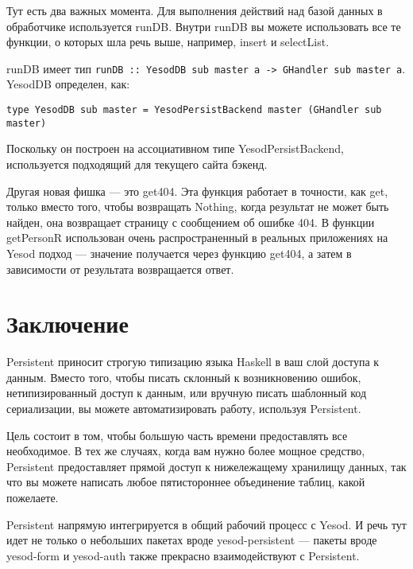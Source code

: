 Тут есть два важных момента. Для выполнения действий над базой данных в обработчике используется runDB. Внутри runDB вы можете использовать все те функции, о которых шла речь выше, например, insert и selectList. 

\begin{remark}
runDB имеет тип \lstinline'runDB :: YesodDB sub master a -> GHandler sub master a'. YesodDB определен, как:

\begin{lstlisting}
type YesodDB sub master = YesodPersistBackend master (GHandler sub master)
\end{lstlisting}

Поскольку он построен на ассоциативном типе YesodPersistBackend, используется подходящий для текущего сайта бэкенд.
\end{remark}

Другая новая фишка --- это get404. Эта функция работает в точности, как get, только вместо того, чтобы возвращать Nothing, когда результат не может быть найден, она возвращает страницу с сообщением об ошибке 404. В функции getPersonR использован очень распространенный в реальных приложениях на Yesod подход --- значение получается через функцию get404, а затем в зависимости от результата возвращается ответ.

\section{Заключение} %

Persistent приносит строгую типизацию языка Haskell в ваш слой доступа к данным. Вместо того, чтобы писать склонный к возникновению ошибок, нетипизированный доступ к данным, или вручную писать шаблонный код сериализации, вы можете автоматизировать работу, используя Persistent.

Цель состоит в том, чтобы большую часть времени предоставлять все необходимое. В тех же случаях, когда вам нужно более мощное средство, Persistent предоставляет прямой доступ к нижележащему хранилищу данных, так что вы можете написать любое пятистороннее объединение таблиц, какой пожелаете.

Persistent напрямую интегрируется в общий рабочий процесс с Yesod. И речь тут идет не только о небольших пакетах вроде yesod-persistent --- пакеты вроде yesod-form и yesod-auth также прекрасно взаимодействуют с Persistent.  %
